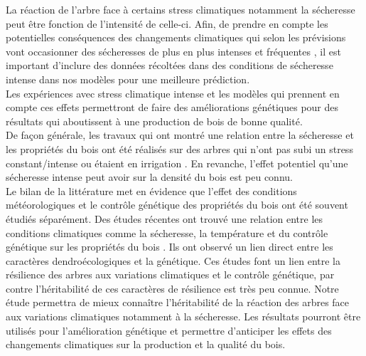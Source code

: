 \documentclass{report}
\begin{document}
La réaction de l'arbre face à certains stress climatiques notamment la sécheresse peut être fonction de l'intensité de celle-ci. Afin, de prendre en compte les potentielles conséquences des changements climatiques qui selon les prévisions vont occasionner des sécheresses de plus en plus intenses et fréquentes \citep{IPCC_2015}, il est important d'inclure des données récoltées dans des conditions de sécheresse intense dans nos modèles pour une meilleure prédiction.\\
Les expériences avec stress climatique intense et les modèles qui prennent en compte ces effets permettront de faire des améliorations génétiques pour des résultats qui aboutissent à une production de bois de bonne qualité.\\

De façon générale, les travaux qui ont montré une relation entre la sécheresse et les propriétés du bois ont été réalisés sur des arbres qui n'ont pas subi un stress constant/intense ou étaient en irrigation \citep{Xu2012,Drew2009,Campelo2013,Jyske2009,Wilkinson2015}. En revanche, l'effet potentiel qu'une sécheresse intense peut avoir sur la densité du bois est peu connu.\\ %

Le bilan de la littérature met en évidence que l'effet des conditions météorologiques et le contrôle génétique des propriétés du bois ont été souvent étudiés séparément. Des études récentes ont trouvé une relation entre les conditions climatiques comme la sécheresse, la température et du contrôle génétique sur les propriétés du bois \citep{Housset2018, Heer2018}. Ils ont observé un lien direct entre les caractères dendroécologiques et la génétique. Ces études font un lien entre la résilience des arbres aux variations climatiques et le contrôle génétique, par contre l'héritabilité de ces caractères de résilience est très peu connue. Notre étude permettra de mieux connaître l'héritabilité de la réaction des arbres face aux variations climatiques notamment à la sécheresse. Les résultats pourront être utilisés pour l'amélioration génétique et permettre d'anticiper les effets des changements climatiques sur la production et la qualité du bois. \\

\end{document}
